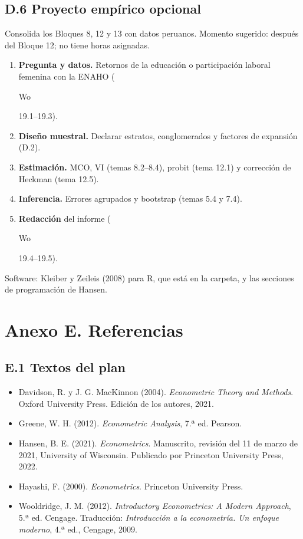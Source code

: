 \documentclass[11pt,a4paper]{article}
\newcommand{\etiqueta}[2]{%
  {\setlength{\fboxsep}{1.4pt}\colorbox{#1}{\sffamily\bfseries\color{white}\strut#2}}}
\newcommand{\WO}[1]{\etiqueta{colorWo}{Wo}\nobreak\hspace{0.25em}\textcolor{colorWo}{#1}}
\begin{document}
\subsection*{D.6 Proyecto empírico opcional}
Consolida los Bloques 8, 12 y 13 con datos peruanos. Momento sugerido:
después del Bloque 12; no tiene horas asignadas.
\begin{enumerate}[leftmargin=1.6em,itemsep=2pt]
  \item \textbf{Pregunta y datos.} Retornos de la educación o participación
        laboral femenina con la ENAHO (\WO{19.1--19.3}).
  \item \textbf{Diseño muestral.} Declarar estratos, conglomerados y factores
        de expansión (D.2).
  \item \textbf{Estimación.} MCO, VI (temas 8.2--8.4), probit (tema 12.1) y
        corrección de Heckman (tema 12.5).
  \item \textbf{Inferencia.} Errores agrupados y bootstrap (temas 5.4 y 7.4).
  \item \textbf{Redacción} del informe (\WO{19.4--19.5}).
\end{enumerate}
Software: Kleiber y Zeileis (2008) para R, que está en la carpeta, y las
secciones de programación de Hansen.

\section*{Anexo E. Referencias}

\subsection*{E.1 Textos del plan}
{\small
\begin{itemize}[leftmargin=1.4em,itemsep=1pt,label={}]
\item Davidson, R. y J. G. MacKinnon (2004). \emph{Econometric Theory and Methods}. Oxford University Press. Edición de los autores, 2021.
\item Greene, W. H. (2012). \emph{Econometric Analysis}, 7.ª ed. Pearson.
\item Hansen, B. E. (2021). \emph{Econometrics}. Manuscrito, revisión del 11 de marzo de 2021, University of Wisconsin. Publicado por Princeton University Press, 2022.
\item Hayashi, F. (2000). \emph{Econometrics}. Princeton University Press.
\item Wooldridge, J. M. (2012). \emph{Introductory Econometrics: A Modern Approach}, 5.ª ed. Cengage. Traducción: \emph{Introducción a la econometría. Un enfoque moderno}, 4.ª ed., Cengage, 2009.
\end{itemize}
}
\end{document}
